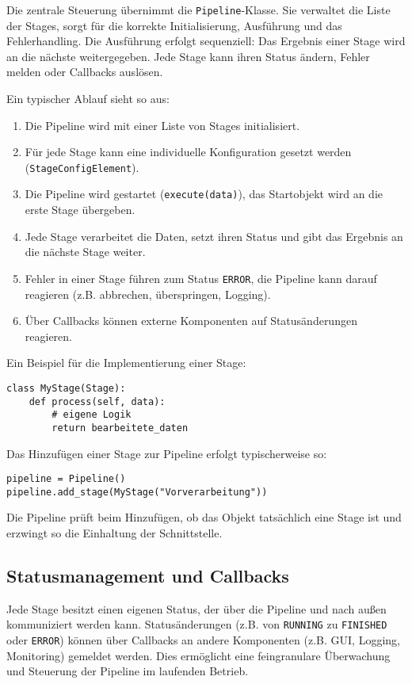 \documentclass[a4paper]{article} %
\begin{document}
Die zentrale Steuerung übernimmt die \texttt{Pipeline}-Klasse. Sie verwaltet die Liste der Stages, sorgt für die korrekte Initialisierung, Ausführung und das Fehlerhandling. Die Ausführung erfolgt sequenziell: Das Ergebnis einer Stage wird an die nächste weitergegeben. Jede Stage kann ihren Status ändern, Fehler melden oder Callbacks auslösen.

Ein typischer Ablauf sieht so aus:
\begin{enumerate}
    \item Die Pipeline wird mit einer Liste von Stages initialisiert.
    \item Für jede Stage kann eine individuelle Konfiguration gesetzt werden (\texttt{StageConfigElement}).
    \item Die Pipeline wird gestartet (\texttt{execute(data)}), das Startobjekt wird an die erste Stage übergeben.
    \item Jede Stage verarbeitet die Daten, setzt ihren Status und gibt das Ergebnis an die nächste Stage weiter.
    \item Fehler in einer Stage führen zum Status \texttt{ERROR}, die Pipeline kann darauf reagieren (z.B. abbrechen, überspringen, Logging).
    \item Über Callbacks können externe Komponenten auf Statusänderungen reagieren.
\end{enumerate}

Ein Beispiel für die Implementierung einer Stage:
\begin{verbatim}
class MyStage(Stage):
    def process(self, data):
        # eigene Logik
        return bearbeitete_daten
\end{verbatim}

Das Hinzufügen einer Stage zur Pipeline erfolgt typischerweise so:
\begin{verbatim}
pipeline = Pipeline()
pipeline.add_stage(MyStage("Vorverarbeitung"))
\end{verbatim}

Die Pipeline prüft beim Hinzufügen, ob das Objekt tatsächlich eine Stage ist und erzwingt so die Einhaltung der Schnittstelle.

\subsection{Statusmanagement und Callbacks}

Jede Stage besitzt einen eigenen Status, der über die Pipeline und nach außen kommuniziert werden kann. Statusänderungen (z.B. von \texttt{RUNNING} zu \texttt{FINISHED} oder \texttt{ERROR}) können über Callbacks an andere Komponenten (z.B. GUI, Logging, Monitoring) gemeldet werden. Dies ermöglicht eine feingranulare Überwachung und Steuerung der Pipeline im laufenden Betrieb.
\end{document}
